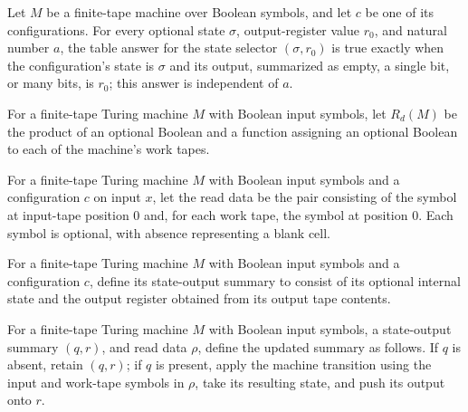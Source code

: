 \begin{theorem}
\label{Complexity.Meyer.tabAns_st}
\leanok
{}
Let $M$ be a finite-tape machine over Boolean symbols, and let $c$ be one of its
configurations. For every optional state $\sigma$, output-register value $r_0$, and
natural number $a$, the table answer for the state selector $(\sigma,r_0)$ is true
exactly when the configuration's state is $\sigma$ and its output, summarized as empty,
a single bit, or many bits, is $r_0$; this answer is independent of $a$.
\end{theorem}

\begin{definition}
\label{Complexity.Meyer.Rd}
\leanok
For a finite-tape Turing machine $M$ with Boolean input symbols, let $R_d(M)$ be the
product of an optional Boolean and a function assigning an optional Boolean to each of
the machine's work tapes.
\end{definition}

\begin{definition}
\label{Complexity.Meyer.reads}
\leanok
{}
For a finite-tape Turing machine $M$ with Boolean input symbols and a configuration $c$
on input $x$, let the read data be the pair consisting of the symbol at input-tape
position $0$ and, for each work tape, the symbol at position $0$. Each symbol is
optional, with absence representing a blank cell.
\end{definition}

\begin{definition}
\label{Complexity.Meyer.SS}
\leanok
{}
For a finite-tape Turing machine $M$ with Boolean input symbols and a configuration $c$,
define its state-output summary to consist of its optional internal state and the output
register obtained from its output tape contents.
\end{definition}

\begin{definition}
\label{Complexity.Meyer.ruleS}
\leanok
{}
For a finite-tape Turing machine $M$ with Boolean input symbols, a state-output summary
$(q,r)$, and read data $\rho$, define the updated summary as follows. If $q$ is absent,
retain $(q,r)$; if $q$ is present, apply the machine transition using the input and
work-tape symbols in $\rho$, take its resulting state, and push its output onto $r$.
\end{definition}

